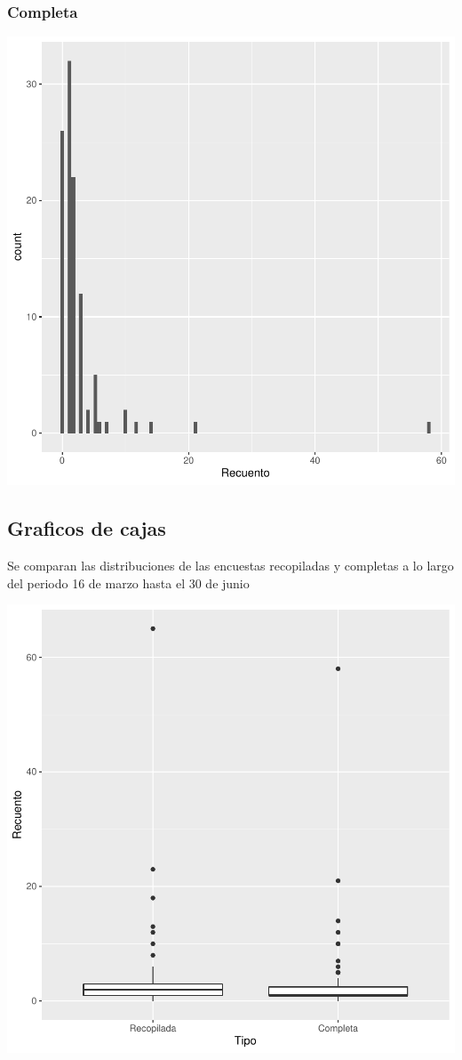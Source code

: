 \documentclass{article}
\begin{document}
\subsubsection{Completa}

\includegraphics{seguimento2-036}

\subsection{Graficos de cajas}
Se comparan las distribuciones de las encuestas recopiladas y completas a lo largo del periodo 16 de marzo hasta el 30 de junio

\includegraphics{seguimento2-037}
\end{document}
